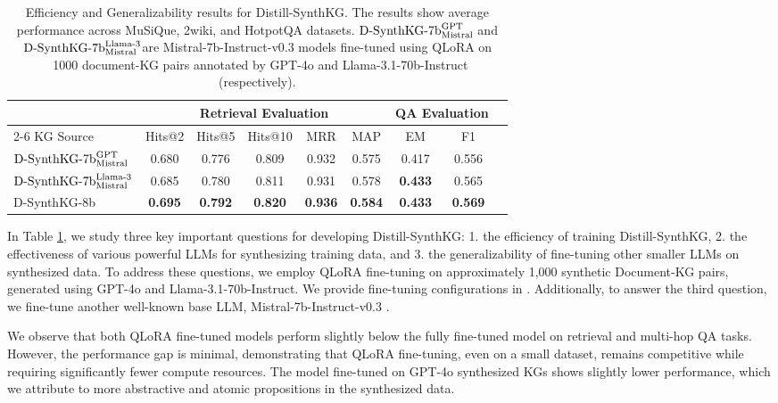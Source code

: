 \documentclass{article} %
\newcommand{\distilledLlama}{\textrm{D-SynthKG-8b}}
\newcommand{\distilledMistralGpt}{$\textrm{D-SynthKG-7b}_{\text{\scriptsize Mistral }}^{\text{\scriptsize GPT}}$}
\newcommand{\distilledMistralLlama}{$\textrm{D-SynthKG-7b}_{\text{\scriptsize Mistral }}^{\text{\scriptsize Llama-3}}$}
\begin{document}
\begin{table}[ht]
    \centering
    \small
    \begin{tabular}{lcccccccc}
    \toprule
    & \multicolumn{5}{c}{Retrieval Evaluation} & \multicolumn{2}{c}{QA Evaluation} \\
    \cmidrule{2-6}
    \cmidrule{7-8}
    KG Source & Hits@2 & Hits@5 & Hits@10 & MRR & MAP & EM & F1 \\
    \midrule
    \distilledMistralGpt & 0.680 & 0.776 & 0.809 & 0.932 & 0.575 & 0.417 & 0.556 \\[0.1cm]
    \distilledMistralLlama & 0.685 & 0.780 & 0.811 & 0.931 & 0.578 & \textbf{0.433} & 0.565 \\
    \midrule
    \distilledLlama & \textbf{0.695} & \textbf{0.792} & \textbf{0.820} & \textbf{0.936} & \textbf{0.584} & \textbf{0.433} & \textbf{0.569} \\ 
    \bottomrule
    \end{tabular}
    \caption{Efficiency and Generalizability results for Distill-SynthKG. The results show average performance across MuSiQue, 2wiki, and HotpotQA datasets. \distilledMistralGpt and \distilledMistralLlama are Mistral-7b-Instruct-v0.3 models fine-tuned using QLoRA on ~1000 document-KG pairs annotated by GPT-4o and Llama-3.1-70b-Instruct (respectively).}
    \label{tab:mistral_qlora_ablation}
\end{table}

In Table \ref{tab:mistral_qlora_ablation}, we study three key important questions for developing Distill-SynthKG: 1. the efficiency of training Distill-SynthKG, 2. the effectiveness of various powerful LLMs for synthesizing training data, and 3. the generalizability of fine-tuning other smaller LLMs on synthesized data.
To address these questions, we employ QLoRA \citep{dettmers2023qlora} fine-tuning on approximately 1,000 synthetic Document-KG pairs, generated using GPT-4o and Llama-3.1-70b-Instruct. We provide fine-tuning configurations in . Additionally, to answer the third question, we fine-tune another well-known base LLM, Mistral-7b-Instruct-v0.3 \citep{jiang2023mistral7b}.

We observe that both QLoRA fine-tuned models perform slightly below the fully fine-tuned model on retrieval and multi-hop QA tasks. However, the performance gap is minimal, demonstrating that QLoRA fine-tuning, even on a small dataset, remains competitive while requiring significantly fewer compute resources. The model fine-tuned on GPT-4o synthesized KGs shows slightly lower performance, which we attribute to more abstractive and atomic propositions in the synthesized data.
\end{document}
